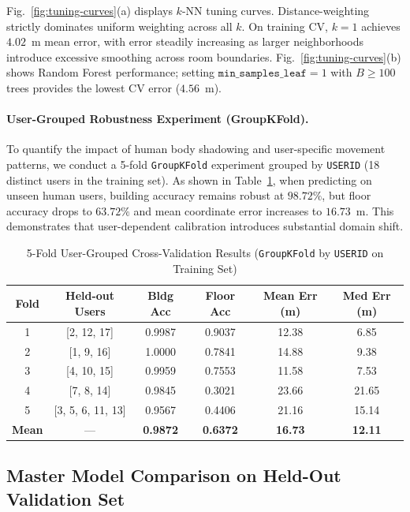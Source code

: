 Fig.~\ref{fig:tuning-curves}(a) displays $k$-NN tuning curves. Distance-weighting strictly dominates uniform weighting across all $k$. On training CV, $k=1$ achieves $4.02$~m mean error, with error steadily increasing as larger neighborhoods introduce excessive smoothing across room boundaries. Fig.~\ref{fig:tuning-curves}(b) shows Random Forest performance; setting $\texttt{min\_samples\_leaf}=1$ with $B \ge 100$ trees provides the lowest CV error ($4.56$~m).

\paragraph{User-Grouped Robustness Experiment (GroupKFold).}
To quantify the impact of human body shadowing and user-specific movement patterns, we conduct a 5-fold \texttt{GroupKFold} experiment grouped by \texttt{USERID} (18 distinct users in the training set). As shown in Table~\ref{tab:group-cv}, when predicting on unseen human users, building accuracy remains robust at $98.72\%$, but floor accuracy drops to $63.72\%$ and mean coordinate error increases to $16.73$~m. This demonstrates that user-dependent calibration introduces substantial domain shift.

\begin{table}[t]
\centering
\caption{5-Fold User-Grouped Cross-Validation Results (\texttt{GroupKFold} by \texttt{USERID} on Training Set)}
\label{tab:group-cv}
\begin{tabular}{cccccc}
\toprule
\textbf{Fold} & \textbf{Held-out Users} & \textbf{Bldg Acc} & \textbf{Floor Acc} & \textbf{Mean Err (m)} & \textbf{Med Err (m)} \\
\midrule
1 & [2, 12, 17] & 0.9987 & 0.9037 & 12.38 & 6.85 \\
2 & [1, 9, 16]  & 1.0000 & 0.7841 & 14.88 & 9.38 \\
3 & [4, 10, 15] & 0.9959 & 0.7553 & 11.58 & 7.53 \\
4 & [7, 8, 14]  & 0.9845 & 0.3021 & 23.66 & 21.65 \\
5 & [3, 5, 6, 11, 13] & 0.9567 & 0.4406 & 21.16 & 15.14 \\
\midrule
\textbf{Mean} & --- & \textbf{0.9872} & \textbf{0.6372} & \textbf{16.73} & \textbf{12.11} \\
\bottomrule
\end{tabular}
\end{table}

\subsection{Master Model Comparison on Held-Out Validation Set}

